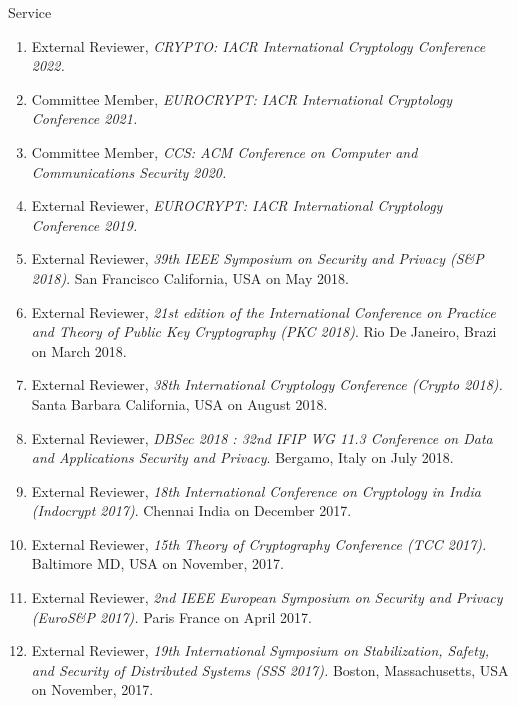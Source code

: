 \documentclass{resume} %
\begin{document}
\begin{rSection}{Service}
	
	\begin{enumerate}[label=E\arabic* --]
		\item External Reviewer,  \emph{CRYPTO: IACR International Cryptology Conference 2022. }
		
		\item Committee Member,  \emph{EUROCRYPT: IACR International Cryptology Conference 2021. }
		
		\item Committee Member,  \emph{CCS: ACM Conference on Computer and Communications Security 2020. }
		
		\item External Reviewer,  \emph{EUROCRYPT: IACR International Cryptology Conference 2019. }
		
		\item External Reviewer,  \emph{39th IEEE Symposium on Security and Privacy (S\&P 2018)}. San Francisco California, USA on May 2018.
		
		\item External Reviewer,  \emph{21st edition of the International Conference on Practice and Theory of Public Key Cryptography (PKC 2018)}. Rio De Janeiro, Brazi on March 2018.
		
		\item External Reviewer,  \emph{38th International Cryptology Conference (Crypto 2018).} Santa Barbara California, USA on August 2018.
		
		\item External Reviewer,  \emph{DBSec 2018 : 32nd IFIP WG 11.3 Conference on Data and Applications Security and Privacy}.  Bergamo, Italy on July 2018.
		
		\item External Reviewer,  \emph{18th International Conference on Cryptology in India (Indocrypt 2017)}. Chennai India on December 2017.
		
		\item External Reviewer, \emph{15th Theory of Cryptography Conference (TCC 2017).}  Baltimore MD, USA on November, 2017.
		
		\item External Reviewer, \emph{2nd IEEE European Symposium on Security and Privacy (EuroS\&P 2017).} Paris France on April 2017.
		
		\item External Reviewer, \emph{19th International Symposium on Stabilization, Safety, and Security of Distributed Systems (SSS 2017).} Boston, Massachusetts, USA on November, 2017.
	\end{enumerate}
	
\end{rSection}
\end{document}
